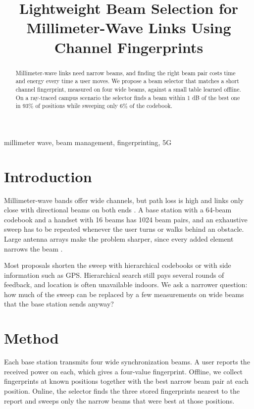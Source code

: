 \documentclass[conference]{IEEEtran}
\begin{document}
\title{Lightweight Beam Selection for Millimeter-Wave Links Using Channel Fingerprints}
\author{}
\maketitle
\begin{abstract}
Millimeter-wave links need narrow beams, and finding the right beam pair costs time and energy every time a user moves. We propose a beam selector that matches a short channel fingerprint, measured on four wide beams, against a small table learned offline. On a ray-traced campus scenario the selector finds a beam within 1 dB of the best one in 93\% of positions while sweeping only 6\% of the codebook.
\end{abstract}
\begin{IEEEkeywords}
millimeter wave, beam management, fingerprinting, 5G
\end{IEEEkeywords}
\section{Introduction}
Millimeter-wave bands offer wide channels, but path loss is high and links only close with directional beams on both
ends \cite{rappaport}. A base station with a 64-beam codebook and a handset with 16 beams has 1024 beam pairs, and an
exhaustive sweep has to be repeated whenever the user turns or walks behind an obstacle. Large antenna arrays make the
problem sharper, since every added element narrows the beam \cite{larsson}.

Most proposals shorten the sweep with hierarchical codebooks or with side information such as GPS. Hierarchical search
still pays several rounds of feedback, and location is often unavailable indoors. We ask a narrower question: how much
of the sweep can be replaced by a few measurements on wide beams that the base station sends anyway?

\section{Method}
Each base station transmits four wide synchronization beams. A user reports the received power on each, which gives a
four-value fingerprint. Offline, we collect fingerprints at known positions together with the best narrow beam pair at
each position. Online, the selector finds the three stored fingerprints nearest to the report and sweeps only the
narrow beams that were best at those positions.
\end{document}
